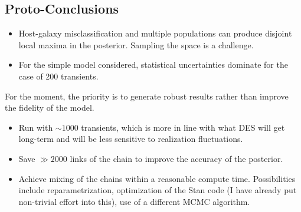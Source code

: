 \documentclass[preprint]{aastex}
\begin{document}
\subsection{Proto-Conclusions}
\begin{itemize}
\item Host-galaxy misclassification and multiple populations can produce disjoint local maxima
in the posterior.  Sampling the space is a challenge.
\item For the simple model considered, statistical uncertainties dominate for the case
of 200 transients.
\end{itemize}

For the moment, the priority is to generate robust results rather than improve
the fidelity of the model.
\begin{itemize}
\item Run with $\sim 1000$ transients, which is more in line with what DES will get long-term
and will be less sensitive to realization fluctuations.
\item Save $\gg 2000$ links  of the chain to improve the accuracy of the posterior.
\item Achieve mixing of the chains within a reasonable compute time.  Possibilities
include reparametrization, optimization of the Stan code (I have already put non-trivial
effort into this), use of a different MCMC algorithm.
\end{itemize}
\end{document}
